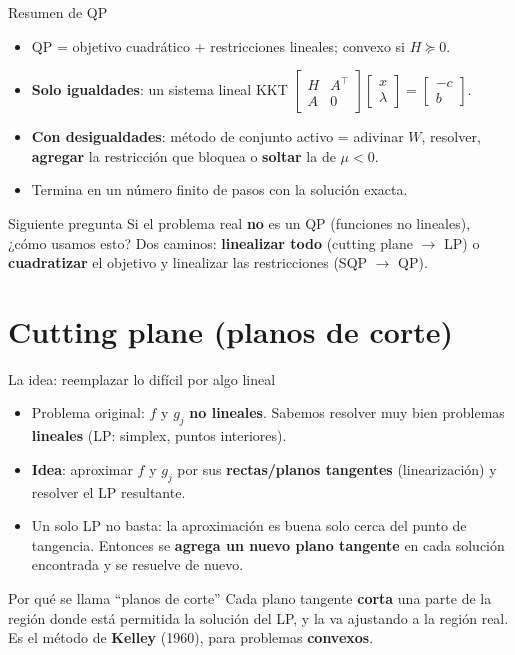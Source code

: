 \documentclass[aspectratio=169]{beamer}
\begin{document}
\begin{frame}{Resumen de QP}
  \begin{itemize}
    \item QP = objetivo cuadrático + restricciones lineales; convexo si $H\succeq0$.
    \item \textbf{Solo igualdades}: un sistema lineal KKT $\begin{bmatrix}H&A^\top\\A&0\end{bmatrix}\begin{bmatrix}x\\\lambda\end{bmatrix}=\begin{bmatrix}-c\\b\end{bmatrix}$.
    \item \textbf{Con desigualdades}: método de conjunto activo = adivinar $W$, resolver, \textbf{agregar} la restricción que bloquea o \textbf{soltar} la de $\mu<0$.
    \item Termina en un número finito de pasos con la solución exacta.
  \end{itemize}
  \begin{alertblock}{Siguiente pregunta}
    Si el problema real \textbf{no} es un QP (funciones no lineales), ¿cómo usamos esto? Dos caminos: \textbf{linealizar todo} (cutting plane $\to$ LP) o \textbf{cuadratizar} el objetivo y linealizar las restricciones (SQP $\to$ QP).
  \end{alertblock}
\end{frame}
\section{Cutting plane (planos de corte)}

\begin{frame}{La idea: reemplazar lo difícil por algo lineal}
  \begin{itemize}
    \item Problema original: $f$ y $g_j$ \textbf{no lineales}. Sabemos resolver muy bien problemas \textbf{lineales} (LP: simplex, puntos interiores).
    \item \textbf{Idea}: aproximar $f$ y $g_j$ por sus \textbf{rectas/planos tangentes} (linearización) y resolver el LP resultante.
    \item Un solo LP no basta: la aproximación es buena solo cerca del punto de tangencia. Entonces se \textbf{agrega un nuevo plano tangente} en cada solución encontrada y se resuelve de nuevo.
  \end{itemize}
  \begin{alertblock}{Por qué se llama ``planos de corte''}
    Cada plano tangente \textbf{corta} una parte de la región donde está permitida la solución del LP, y la va ajustando a la región real. Es el método de \textbf{Kelley} (1960), para problemas \textbf{convexos}.
  \end{alertblock}
\end{frame}
\end{document}
